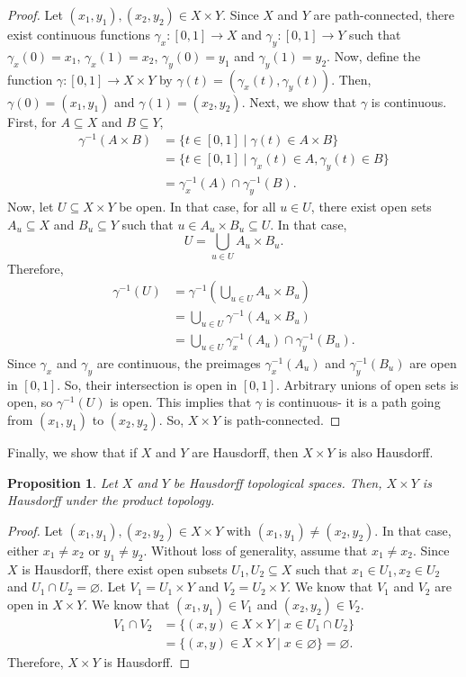 \documentclass[a4paper, openany]{memoir}
\theoremstyle{definition}
\theoremstyle{plain}
\newtheorem{proposition}[definition]{Proposition}
\begin{document}
\begin{proof}
Let $(x_1, y_1), (x_2, y_2) \in X \times Y$. Since $X$ and $Y$ are path-connected, there exist continuous functions $\gamma_x: [0, 1] \to X$ and $\gamma_y: [0, 1] \to Y$ such that $\gamma_x(0) = x_1$, $\gamma_x(1) = x_2$, $\gamma_y(0) = y_1$ and $\gamma_y(1) = y_2$. Now, define the function $\gamma: [0, 1] \to X \times Y$ by $\gamma(t) = (\gamma_x(t), \gamma_y(t))$. Then, $\gamma(0) = (x_1, y_1)$ and $\gamma(1) = (x_2, y_2)$. Next, we show that $\gamma$ is continuous. First, for $A \subseteq X$ and $B \subseteq Y$,
\begin{align*}
    \gamma^{-1}(A \times B) &= \{t \in [0, 1] \mid \gamma(t) \in A \times B\} \\
    &= \{t \in [0, 1] \mid \gamma_x(t) \in A, \gamma_y(t) \in B\} \\
    &= \gamma_x^{-1}(A) \cap \gamma_y^{-1}(B).
\end{align*}
Now, let $U \subseteq X \times Y$ be open. In that case, for all $u \in U$, there exist open sets $A_u \subseteq X$ and $B_u \subseteq Y$ such that $u \in A_u \times B_u \subseteq U$. In that case,
\[U = \bigcup_{u \in U} A_u \times B_u.\]
Therefore,
\begin{align*}
    \gamma^{-1} (U) &= \gamma^{-1} \left(\bigcup_{u \in U} A_u \times B_u\right) \\
    &= \bigcup_{u \in U} \gamma^{-1} (A_u \times B_u) \\
    &= \bigcup_{u \in U} \gamma_x^{-1}(A_u) \cap \gamma_y^{-1}(B_u).
\end{align*}
Since $\gamma_x$ and $\gamma_y$ are continuous, the preimages $\gamma_x^{-1}(A_u)$ and $\gamma_y^{-1}(B_u)$ are open in $[0, 1]$. So, their intersection is open in $[0, 1]$. Arbitrary unions of open sets is open, so $\gamma^{-1} (U)$ is open. This implies that $\gamma$ is continuous- it is a path going from $(x_1, y_1)$ to $(x_2, y_2)$. So, $X \times Y$ is path-connected.
\end{proof}
\noindent Finally, we show that if $X$ and $Y$ are Hausdorff, then $X \times Y$ is also Hausdorff.
\begin{proposition}
Let $X$ and $Y$ be Hausdorff topological spaces. Then, $X \times Y$ is Hausdorff under the product topology.
\end{proposition}
\begin{proof}
Let $(x_1, y_1), (x_2, y_2) \in X \times Y$ with $(x_1, y_1) \neq (x_2, y_2)$. In that case, either $x_1 \neq x_2$ or $y_1 \neq y_2$. Without loss of generality, assume that $x_1 \neq x_2$. Since $X$ is Hausdorff, there exist open subsets $U_1, U_2 \subseteq X$ such that $x_1 \in U_1, x_2 \in U_2$ and $U_1 \cap U_2 = \varnothing$. Let $V_1 = U_1 \times Y$ and $V_2 = U_2 \times Y$. We know that $V_1$ and $V_2$ are open in $X \times Y$. We know that $(x_1, y_1) \in V_1$ and $(x_2, y_2) \in V_2$. 
\begin{align*}
    V_1 \cap V_2 &= \{(x, y) \in X \times Y \mid x \in U_1 \cap U_2\} \\
    &= \{(x, y) \in X \times Y \mid x \in \varnothing\} = \varnothing.
\end{align*}
Therefore, $X \times Y$ is Hausdorff.
\end{proof}
\end{document}
